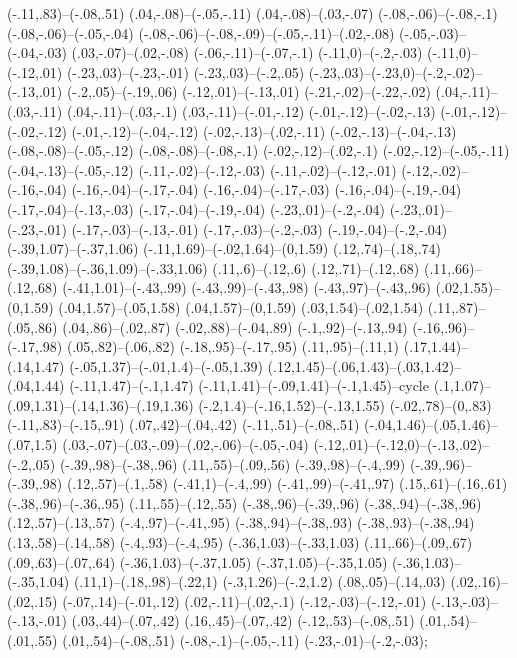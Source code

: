 {(-.11,.83)--(-.08,.51) (.04,-.08)--(-.05,-.11) (.04,-.08)--(.03,-.07) (-.08,-.06)--(-.08,-.1) (-.08,-.06)--(-.05,-.04) (-.08,-.06)--(-.08,-.09)--(-.05,-.11)--(.02,-.08) (-.05,-.03)--(-.04,-.03) (.03,-.07)--(.02,-.08) (-.06,-.11)--(-.07,-.1) (-.11,0)--(-.2,-.03) (-.11,0)--(-.12,.01) (-.23,.03)--(-.23,-.01) (-.23,.03)--(-.2,.05) (-.23,.03)--(-.23,0)--(-.2,-.02)--(-.13,.01) (-.2,.05)--(-.19,.06) (-.12,.01)--(-.13,.01) (-.21,-.02)--(-.22,-.02) (.04,-.11)--(.03,-.11) (.04,-.11)--(.03,-.1) (.03,-.11)--(-.01,-.12) (-.01,-.12)--(-.02,-.13) (-.01,-.12)--(-.02,-.12) (-.01,-.12)--(-.04,-.12) (-.02,-.13)--(.02,-.11) (-.02,-.13)--(-.04,-.13) (-.08,-.08)--(-.05,-.12) (-.08,-.08)--(-.08,-.1) (-.02,-.12)--(.02,-.1) (-.02,-.12)--(-.05,-.11) (-.04,-.13)--(-.05,-.12) (-.11,-.02)--(-.12,-.03) (-.11,-.02)--(-.12,-.01) (-.12,-.02)--(-.16,-.04) (-.16,-.04)--(-.17,-.04) (-.16,-.04)--(-.17,-.03) (-.16,-.04)--(-.19,-.04) (-.17,-.04)--(-.13,-.03) (-.17,-.04)--(-.19,-.04) (-.23,.01)--(-.2,-.04) (-.23,.01)--(-.23,-.01) (-.17,-.03)--(-.13,-.01) (-.17,-.03)--(-.2,-.03) (-.19,-.04)--(-.2,-.04) (-.39,1.07)--(-.37,1.06) (-.11,1.69)--(-.02,1.64)--(0,1.59) (.12,.74)--(.18,.74) (-.39,1.08)--(-.36,1.09)--(-.33,1.06) (.11,.6)--(.12,.6) (.12,.71)--(.12,.68) (.11,.66)--(.12,.68) (-.41,1.01)--(-.43,.99) (-.43,.99)--(-.43,.98) (-.43,.97)--(-.43,.96) (.02,1.55)--(0,1.59) (.04,1.57)--(.05,1.58) (.04,1.57)--(0,1.59) (.03,1.54)--(.02,1.54) (.11,.87)--(.05,.86) (.04,.86)--(.02,.87) (-.02,.88)--(-.04,.89) (-.1,.92)--(-.13,.94) (-.16,.96)--(-.17,.98) (.05,.82)--(.06,.82) (-.18,.95)--(-.17,.95) (.11,.95)--(.11,1) (.17,1.44)--(.14,1.47) (-.05,1.37)--(-.01,1.4)--(-.05,1.39) (.12,1.45)--(.06,1.43)--(.03,1.42)--(.04,1.44) (-.11,1.47)--(-.1,1.47) (-.11,1.41)--(-.09,1.41)--(-.1,1.45)--cycle (.1,1.07)--(.09,1.31)--(.14,1.36)--(.19,1.36) (-.2,1.4)--(-.16,1.52)--(-.13,1.55) (-.02,.78)--(0,.83) (-.11,.83)--(-.15,.91) (.07,.42)--(.04,.42) (-.11,.51)--(-.08,.51) (-.04,1.46)--(.05,1.46)--(.07,1.5) (.03,-.07)--(.03,-.09)--(.02,-.06)--(-.05,-.04) (-.12,.01)--(-.12,0)--(-.13,.02)--(-.2,.05) (-.39,.98)--(-.38,.96) (.11,.55)--(.09,.56) (-.39,.98)--(-.4,.99) (-.39,.96)--(-.39,.98) (.12,.57)--(.1,.58) (-.41,1)--(-.4,.99) (-.41,.99)--(-.41,.97) (.15,.61)--(.16,.61) (-.38,.96)--(-.36,.95) (.11,.55)--(.12,.55) (-.38,.96)--(-.39,.96) (-.38,.94)--(-.38,.96) (.12,.57)--(.13,.57) (-.4,.97)--(-.41,.95) (-.38,.94)--(-.38,.93) (-.38,.93)--(-.38,.94) (.13,.58)--(.14,.58) (-.4,.93)--(-.4,.95) (-.36,1.03)--(-.33,1.03) (.11,.66)--(.09,.67) (.09,.63)--(.07,.64) (-.36,1.03)--(-.37,1.05) (-.37,1.05)--(-.35,1.05) (-.36,1.03)--(-.35,1.04) (.11,1)--(.18,.98)--(.22,1) (-.3,1.26)--(-.2,1.2) (.08,.05)--(.14,.03) (.02,.16)--(.02,.15) (-.07,.14)--(-.01,.12) (.02,-.11)--(.02,-.1) (-.12,-.03)--(-.12,-.01) (-.13,-.03)--(-.13,-.01) (.03,.44)--(.07,.42) (.16,.45)--(.07,.42) (-.12,.53)--(-.08,.51) (.01,.54)--(.01,.55) (.01,.54)--(-.08,.51) (-.08,-.1)--(-.05,-.11) (-.23,-.01)--(-.2,-.03);
}

